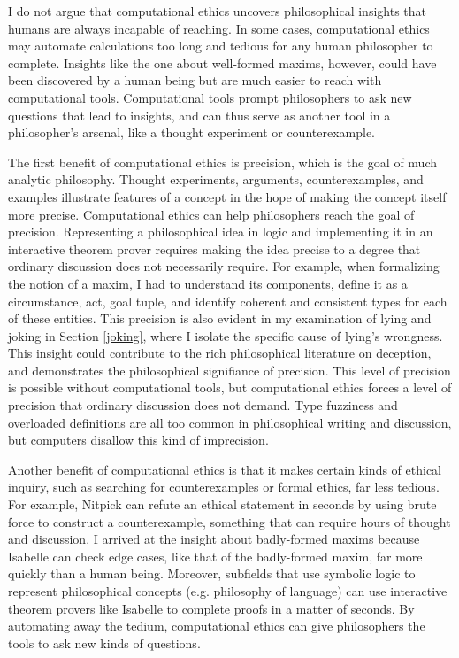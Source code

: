 \begin{isabellebody}
\begin{isamarkuptext}
I do not argue that computational ethics uncovers philosophical insights that humans are always incapable 
of reaching. In some cases, computational ethics may automate calculations too long and tedious for 
any human philosopher to complete. Insights like the one about well-formed maxims, however, could 
have been discovered by a human being but are much easier to reach with computational tools. Computational tools prompt philosophers 
to ask new questions that lead to insights, and can thus serve as another tool in a philosopher's arsenal, like a 
thought experiment or counterexample.

The first benefit of computational ethics is precision, which is the goal of much analytic
philosophy. Thought experiments, arguments, counterexamples, and examples 
illustrate features of a concept in the hope of making the concept itself more precise. Computational 
ethics can help philosophers reach the goal of precision. Representing a philosophical idea in logic 
and implementing it in an interactive theorem prover requires making the idea precise to a degree 
that ordinary discussion does not necessarily require. For example, when formalizing the notion of a 
maxim, I had to understand its components, define it as a circumstance, act, goal tuple, and identify
coherent and consistent types for each of these entities. This precision is also evident in my examination
of lying and joking in Section \ref{joking}, where I isolate the specific cause of lying's wrongness.
This insight could contribute to the rich philosophical literature on deception, and demonstrates the 
philosophical signifiance of precision. This level of precision is possible 
without computational tools, but computational ethics forces a level of precision that ordinary discussion 
does not demand. Type fuzziness and overloaded definitions are all too common in philosophical writing and 
discussion, but computers disallow this kind of imprecision.

Another benefit of computational ethics is that it makes certain kinds of ethical inquiry, such as 
searching for counterexamples or formal ethics, far less tedious. For example, Nitpick can refute 
an ethical statement in seconds by using brute force to construct a counterexample, something that can require hours
of thought and discussion. I arrived at the insight about badly-formed maxims because Isabelle 
can check edge cases, like that of the badly-formed maxim, far more quickly than a human being. Moreover, 
subfields that use symbolic logic to represent philosophical concepts (e.g. philosophy of language) can 
use interactive theorem provers like Isabelle to complete proofs in a matter of seconds. By automating 
away the tedium, computational ethics can give philosophers the tools to ask new kinds of questions.


\end{isamarkuptext}
\end{isabellebody}
